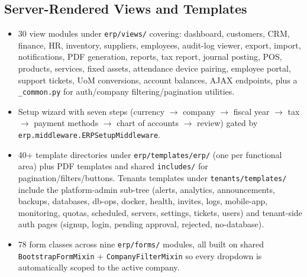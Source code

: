 \documentclass[12pt,a4paper]{report}
\begin{document}
\subsection{Server-Rendered Views and Templates}
\begin{itemize}
  \item 30 view modules under \texttt{erp/views/} covering: dashboard, customers, CRM, finance, HR, inventory, suppliers, employees, audit-log viewer, export, import, notifications, PDF generation, reports, tax report, journal posting, POS, products, services, fixed assets, attendance device pairing, employee portal, support tickets, UoM conversions, account balances, AJAX endpoints, plus a \texttt{\_common.py} for auth/company filtering/pagination utilities.
  \item Setup wizard with seven steps (currency $\to$ company $\to$ fiscal year $\to$ tax $\to$ payment methods $\to$ chart of accounts $\to$ review) gated by \texttt{erp.middleware.ERPSetupMiddleware}.
  \item 40+ template directories under \texttt{erp/templates/erp/} (one per functional area) plus PDF templates and shared \texttt{includes/} for pagination/filters/buttons. Tenants templates under \texttt{tenants/templates/} include the platform-admin sub-tree (alerts, analytics, announcements, backups, databases, db-ops, docker, health, invites, logs, mobile-app, monitoring, quotas, scheduled, servers, settings, tickets, users) and tenant-side auth pages (signup, login, pending approval, rejected, no-database).
  \item 78 form classes across nine \texttt{erp/forms/} modules, all built on shared \texttt{BootstrapFormMixin} + \texttt{CompanyFilterMixin} so every dropdown is automatically scoped to the active company.
\end{itemize}
\end{document}
